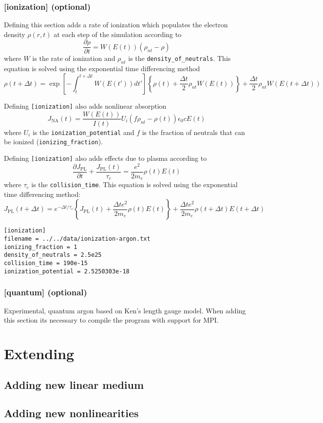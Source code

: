 \documentclass{article}
\begin{document}
\subsubsection{[ionization] (optional)}
Defining this section adds a rate of ionization which populates the
electron density $\rho(r,t)$ at each step of the simulation according to
\[\frac{\partial \rho}{\partial t} = W(E(t)) (\rho_{nt}-\rho)\]
where $W$ is the rate of ionization and $\rho_{nt}$ is the
\texttt{density\_of\_neutrals}.  This equation is solved using the
exponential time differencing method
\[\rho(t+\Delta t) = \exp\left[-\int_t^{t+\Delta t} W(E(t')) dt'\right]\left\{\rho(t) + \frac{\Delta t}{2} \rho_{nt}W(E(t))\right\} + \frac{\Delta t}{2} \rho_{nt} W(E(t+\Delta t))\]


Defining \texttt{[ionization]} also adds nonlinear absorption
\[J_{\mathrm{NA}}(t) = \frac{W(E(t))}{I(t)} U_i \left(f\rho_{nt} -
    \rho(t)\right) \epsilon_0 c E(t)\] where $U_i$ is the
\texttt{ionization\_potential} and $f$ is the fraction of neutrals
that can be ionized (\texttt{ionizing\_fraction}).

Defining \texttt{[ionization]} also adds effects due to plasma according to
\[\frac{\partial J_{\mathrm{PL}}}{\partial t} + \frac{J_{\mathrm{PL}}(t)}{\tau_c} = \frac{e^2}{2 m_e} \rho(t) E(t)\]
where $\tau_c$ is the \texttt{collision\_time}. This equation is
solved using the exponential time differencing method:
\[J_{\mathrm{PL}}(t+\Delta t) = e^{-\Delta t/\tau_c}\left\{J_{\mathrm{PL}}(t) + \frac{\Delta t e^2}{2 m_e}\rho(t)E(t)\right\} + \frac{\Delta t e^2}{2 m_e} \rho(t+\Delta t) E(t+\Delta t)\]

\begin{lstlisting}
[ionization]
filename = ../../data/ionization-argon.txt
ionizing_fraction = 1
density_of_neutrals = 2.5e25
collision_time = 190e-15
ionization_potential = 2.5250303e-18
\end{lstlisting}

\subsubsection{[quantum] (optional)}
Experimental, quantum argon based on Ken's length gauge model. When
adding this section its necessary to compile the program with support
for MPI.

\section{Extending}
\subsection{Adding new linear medium}
\subsection{Adding new nonlinearities}
\end{document}
